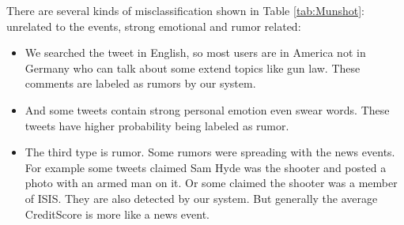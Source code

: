 There are several kinds of misclassification shown in Table 
\ref{tab:Munshot}: 
unrelated to the events, strong emotional and rumor related:
\begin{itemize}
	\item We searched the tweet in English, so most users are in America not in Germany who can talk about some extend topics like gun law. These comments are labeled as rumors by our system. 
\item And some tweets contain strong personal emotion even swear words. These tweets have higher probability being labeled as rumor. 
\item The third type is rumor. Some rumors were spreading with the news events. For example some tweets claimed Sam Hyde was the shooter and posted a photo with an armed man on it. Or some claimed the shooter was a member of ISIS. They are also detected by our system. But generally the average CreditScore is more like a news event.
\end{itemize}

